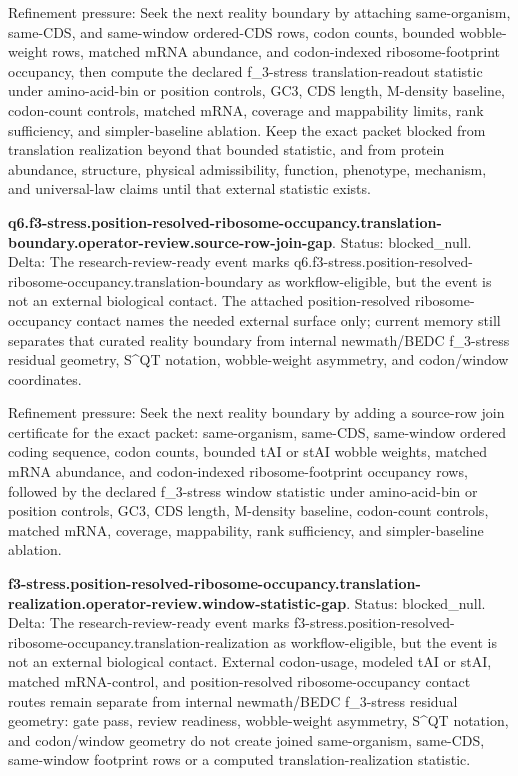 Refinement pressure: Seek the next reality boundary by attaching same-organism, same-CDS, and same-window ordered-CDS rows, codon counts, bounded wobble-weight rows, matched mRNA abundance, and codon-indexed ribosome-footprint occupancy, then compute the declared f\_3-stress translation-readout statistic under amino-acid-bin or position controls, GC3, CDS length, M-density baseline, codon-count controls, matched mRNA, coverage and mappability limits, rank sufficiency, and simpler-baseline ablation. Keep the exact packet blocked from translation realization beyond that bounded statistic, and from protein abundance, structure, physical admissibility, function, phenotype, mechanism, and universal-law claims until that external statistic exists.

\textbf{q6.f3-stress.position-resolved-ribosome-occupancy.translation-boundary.operator-review.source-row-join-gap}. Status: blocked\_null. Delta: The research-review-ready event marks q6.f3-stress.position-resolved-ribosome-occupancy.translation-boundary as workflow-eligible, but the event is not an external biological contact. The attached position-resolved ribosome-occupancy contact names the needed external surface only; current memory still separates that curated reality boundary from internal newmath/BEDC f\_3-stress residual geometry, S\textasciicircum{}QT notation, wobble-weight asymmetry, and codon/window coordinates.

Refinement pressure: Seek the next reality boundary by adding a source-row join certificate for the exact packet: same-organism, same-CDS, same-window ordered coding sequence, codon counts, bounded tAI or stAI wobble weights, matched mRNA abundance, and codon-indexed ribosome-footprint occupancy rows, followed by the declared f\_3-stress window statistic under amino-acid-bin or position controls, GC3, CDS length, M-density baseline, codon-count controls, matched mRNA, coverage, mappability, rank sufficiency, and simpler-baseline ablation.

\textbf{f3-stress.position-resolved-ribosome-occupancy.translation-realization.operator-review.window-statistic-gap}. Status: blocked\_null. Delta: The research-review-ready event marks f3-stress.position-resolved-ribosome-occupancy.translation-realization as workflow-eligible, but the event is not an external biological contact. External codon-usage, modeled tAI or stAI, matched mRNA-control, and position-resolved ribosome-occupancy contact routes remain separate from internal newmath/BEDC f\_3-stress residual geometry: gate pass, review readiness, wobble-weight asymmetry, S\textasciicircum{}QT notation, and codon/window geometry do not create joined same-organism, same-CDS, same-window footprint rows or a computed translation-realization statistic.

